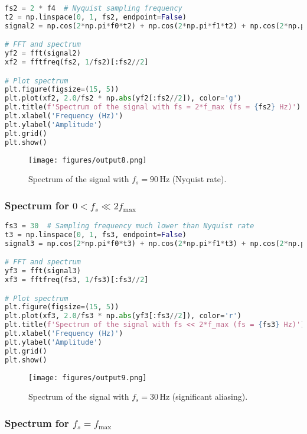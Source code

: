 \documentclass[10pt]{article}
\theoremstyle{definition}
\theoremstyle{remark}
\theoremstyle{definition}
\numberwithin{equation}{prob}
\begin{document}
\begin{lstlisting}[language=Python]
fs2 = 2 * f4  # Nyquist sampling frequency
t2 = np.linspace(0, 1, fs2, endpoint=False)
signal2 = np.cos(2*np.pi*f0*t2) + np.cos(2*np.pi*f1*t2) + np.cos(2*np.pi*f2*t2) + np.cos(2*np.pi*f3*t2) + np.cos(2*np.pi*f4*t2)

# FFT and spectrum
yf2 = fft(signal2)
xf2 = fftfreq(fs2, 1/fs2)[:fs2//2]

# Plot spectrum
plt.figure(figsize=(15, 5))
plt.plot(xf2, 2.0/fs2 * np.abs(yf2[:fs2//2]), color='g')
plt.title(f'Spectrum of the signal with fs = 2*f_max (fs = {fs2} Hz)')
plt.xlabel('Frequency (Hz)')
plt.ylabel('Amplitude')
plt.grid()
plt.show()
\end{lstlisting}

\begin{figure}[H]
    \centering
    \texttt{[image: figures/output8.png]}  
    \caption{Spectrum of the signal with \( f_s = 90 \, \text{Hz} \) (Nyquist rate).}
\end{figure}

\subsubsection{Spectrum for \( 0 < f_s \ll 2f_{\text{max}} \)}

\begin{lstlisting}[language=Python]
fs3 = 30  # Sampling frequency much lower than Nyquist rate
t3 = np.linspace(0, 1, fs3, endpoint=False)
signal3 = np.cos(2*np.pi*f0*t3) + np.cos(2*np.pi*f1*t3) + np.cos(2*np.pi*f2*t3) + np.cos(2*np.pi*f3*t3) + np.cos(2*np.pi*f4*t3)

# FFT and spectrum
yf3 = fft(signal3)
xf3 = fftfreq(fs3, 1/fs3)[:fs3//2]

# Plot spectrum
plt.figure(figsize=(15, 5))
plt.plot(xf3, 2.0/fs3 * np.abs(yf3[:fs3//2]), color='r')
plt.title(f'Spectrum of the signal with fs << 2*f_max (fs = {fs3} Hz)')
plt.xlabel('Frequency (Hz)')
plt.ylabel('Amplitude')
plt.grid()
plt.show()
\end{lstlisting}

\begin{figure}[H]
    \centering
    \texttt{[image: figures/output9.png]}  
    \caption{Spectrum of the signal with \( f_s = 30 \, \text{Hz} \) (significant aliasing).}
\end{figure}

\subsubsection{Spectrum for \( f_s = f_{\text{max}} \)}
\end{document}
